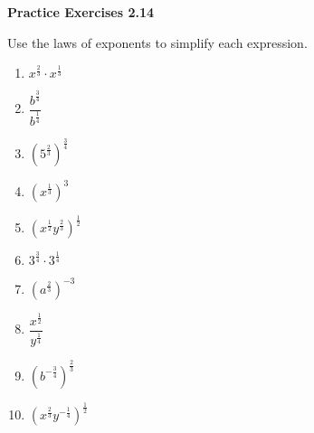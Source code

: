 \vspace{0.3ex}
\noindent\textbf{Practice Exercises 2.14}

\vspace{0.2ex}

Use the laws of exponents to simplify each expression.

\begin{multicols}{2}
\begin{enumerate}[noitemsep, label = \color{blue}\arabic*. ]
    \item $x^{\tfrac{2}{3}} \cdot x^{\tfrac{1}{3}}$
    \item $\dfrac{b^{\tfrac{3}{4}}}{b^{\tfrac{1}{4}}}$
    \item $\left(5^{\tfrac{2}{3}}\right)^{\tfrac{3}{4}}$
    \item $\left(x^{\tfrac{1}{3}}\right)^{3}$
    \item $\left(x^{\tfrac{1}{2}}y^{\tfrac{2}{3}}\right)^{\tfrac{1}{2}} $
    \item $ 3^{\tfrac{3}{4}} \cdot 3^{\tfrac{1}{4}} $
    \item $ \left(a^{\tfrac{2}{3}}\right)^{-3} $
    \item $ \dfrac{x^{\tfrac{1}{2}}}{y^{\tfrac{1}{4}}} $ 
    \item $ \left(b^{-\tfrac{3}{4}}\right)^{\tfrac{2}{3}} $
    \item $ \left(x^{\tfrac{2}{3}}y^{-\tfrac{1}{4}}\right)^{\tfrac{1}{2}} $
\end{enumerate}
\end{multicols}
